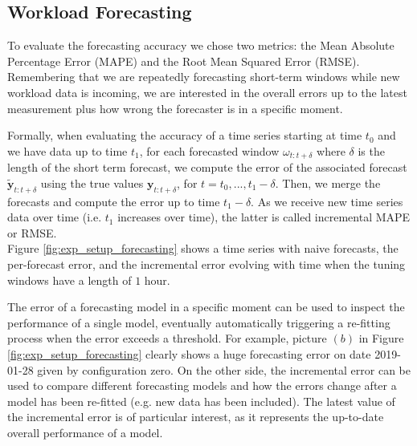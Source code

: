 \documentclass[a4paper, 12pt]{article} %
\begin{document}
	\subsection{Workload Forecasting } \label{ssec:exp_workload_forecasting}
	To evaluate the forecasting accuracy we chose two metrics: the Mean Absolute Percentage Error (MAPE) and the Root Mean Squared Error (RMSE).  Remembering that we are repeatedly forecasting short-term windows while new workload data is incoming, we are interested in the overall errors up to the latest measurement plus how wrong the forecaster is in a specific moment.
	
	Formally, when evaluating the accuracy of a time series starting at time $t_0$ and we have data up to time $t_1$, for each forecasted window $\omega_{t:t+\delta}$ where $\delta$ is the length of the short term forecast, we compute the error of the associated forecast $\tilde{\pmb{y}}_{t:t+\delta}$ using the true values $\pmb{y}_{t:t+\delta}$, for $t=t_0, ..., t_1 - \delta$. Then, we merge the forecasts and compute the error up to time $t_1 - \delta$. As we receive new time series data over time (i.e. $t_1$ increases over time), the latter is called incremental MAPE or RMSE. \\
	Figure \ref{fig:exp_setup_forecasting} shows a time series with naive forecasts, the per-forecast error, and the incremental error evolving with time when the tuning windows have a length of $1$ hour.
	
	The error of a forecasting model in a specific moment can be used to inspect the performance of a single model, eventually automatically triggering a re-fitting process when the error exceeds a threshold. For example, picture $(b)$ in Figure \ref{fig:exp_setup_forecasting} clearly shows a huge forecasting error on date 2019-01-28 given by configuration zero. On the other side, the incremental error can be used to compare different forecasting models and how the errors change after a model has been re-fitted (e.g. new data has been included). The latest value of the incremental error is of particular interest, as it represents the up-to-date overall performance of a model.
	
\end{document}
